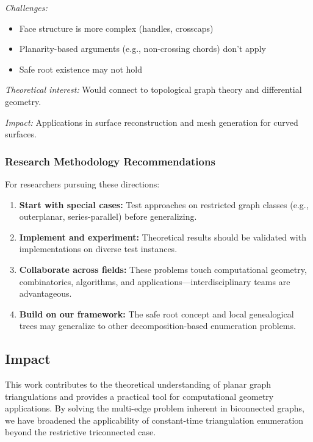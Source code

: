 \documentclass[12pt,a4paper]{article}
\theoremstyle{definition}
\theoremstyle{remark}
\begin{document}
\textit{Challenges:}
\begin{itemize}
\item Face structure is more complex (handles, crosscaps)
\item Planarity-based arguments (e.g., non-crossing chords) don't apply
\item Safe root existence may not hold
\end{itemize}

\textit{Theoretical interest:} Would connect to topological graph theory and differential geometry.

\textit{Impact:} Applications in surface reconstruction and mesh generation for curved surfaces.

\subsubsection{Research Methodology Recommendations}

For researchers pursuing these directions:

\begin{enumerate}
\item \textbf{Start with special cases:} Test approaches on restricted graph classes (e.g., outerplanar, series-parallel) before generalizing.

\item \textbf{Implement and experiment:} Theoretical results should be validated with implementations on diverse test instances.

\item \textbf{Collaborate across fields:} These problems touch computational geometry, combinatorics, algorithms, and applications—interdisciplinary teams are advantageous.

\item \textbf{Build on our framework:} The safe root concept and local genealogical trees may generalize to other decomposition-based enumeration problems.
\end{enumerate}

\subsection{Impact}

This work contributes to the theoretical understanding of planar graph triangulations and provides a practical tool for computational geometry applications. By solving the multi-edge problem inherent in biconnected graphs, we have broadened the applicability of constant-time triangulation enumeration beyond the restrictive triconnected case.
\end{document}
